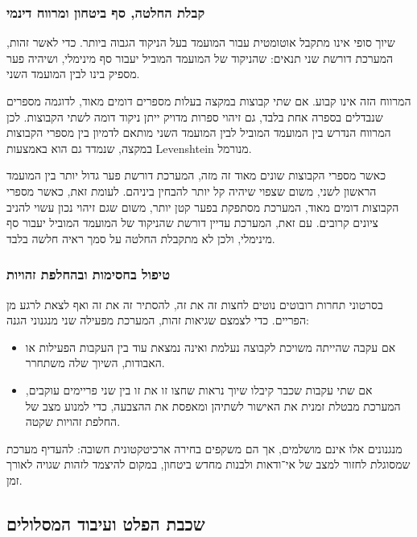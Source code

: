 \subsubsection{קבלת החלטה, סף ביטחון ומרווח דינמי}

שיוך סופי אינו מתקבל אוטומטית עבור המועמד בעל הניקוד הגבוה ביותר. כדי
לאשר זהות, המערכת דורשת שני תנאים: שהניקוד של המועמד המוביל יעבור סף
מינימלי, ושיהיה פער מספיק בינו לבין המועמד השני.

המרווח הזה אינו קבוע. אם שתי קבוצות במקצה בעלות מספרים דומים מאוד,
לדוגמה מספרים שנבדלים בספרה אחת בלבד, גם זיהוי ספרות מדויק ייתן ניקוד
דומה לשתי הקבוצות. לכן המרווח הנדרש בין המועמד המוביל לבין המועמד השני
מותאם לדמיון בין מספרי הקבוצות במקצה, שנמדד גם הוא באמצעות
\textenglish{Levenshtein} מנורמל.

כאשר מספרי הקבוצות שונים מאוד זה מזה, המערכת דורשת פער גדול יותר בין
המועמד הראשון לשני, משום שצפוי שיהיה קל יותר להבחין ביניהם. לעומת זאת,
כאשר מספרי הקבוצות דומים מאוד, המערכת מסתפקת בפער קטן יותר, משום שגם
זיהוי נכון עשוי להניב ציונים קרובים. עם זאת, המערכת עדיין דורשת
שהניקוד של המועמד המוביל יעבור סף מינימלי, ולכן לא מתקבלת החלטה על סמך
ראיה חלשה בלבד.

\subsubsection{טיפול בחסימות ובהחלפת זהויות}

בסרטוני תחרות רובוטים נוטים לחצות זה את זה, להסתיר זה את זה ואף לצאת
לרגע מן הפריים. כדי לצמצם שגיאות זהות, המערכת מפעילה שני מנגנוני הגנה:

\begin{itemize}
\item אם עקבה שהייתה משויכת לקבוצה נעלמת ואינה נמצאת עוד בין העקבות
  הפעילות או האבודות, השיוך שלה משתחרר.
\item אם שתי עקבות שכבר קיבלו שיוך נראות שחצו זו את זו בין שני פריימים
  עוקבים, המערכת מבטלת זמנית את האישור לשתיהן ומאפסת את ההצבעה, כדי
  למנוע מצב של החלפת זהויות שקטה.
\end{itemize}

מנגנונים אלו אינם מושלמים, אך הם משקפים בחירה ארכיטקטונית חשובה:
להעדיף מערכת שמסוגלת לחזור למצב של אי־ודאות ולבנות מחדש ביטחון, במקום
להיצמד לזהות שגויה לאורך זמן.

\subsection{שכבת הפלט ועיבוד המסלולים}

